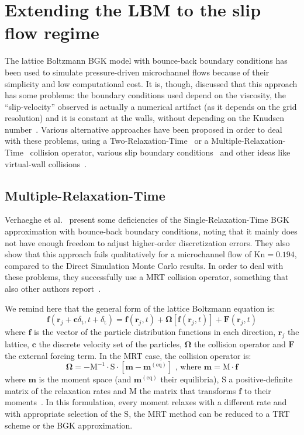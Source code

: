 \section{Extending the LBM to the slip flow regime}
The lattice Boltzmann BGK model with bounce-back boundary conditions has been
used to simulate pressure-driven microchannel flows because of their simplicity
and low computational cost. It is, though, discussed that this approach has some
problems: the boundary conditions used depend on the viscosity, the ``slip-velocity''
observed is actually a numerical artifact (as it depends on the grid resolution)
and it is constant at the walls, without
depending on the Knudsen number~\cite{Verhaeghe2009}. Various alternative
approaches have been proposed in order to deal with these problems, using a
Two-Relaxation-Time~\cite{Norouzi2015} or a Multiple-Relaxation-Time~\cite{Verhaeghe2009} collision operator, various slip
boundary conditions~\cite{Zhang2012} and other ideas like virtual-wall collisions~\cite{Toschi2005}.

\subsection{Multiple-Relaxation-Time}
Verhaeghe et al.~\cite{Verhaeghe2009} present some deficiencies of the Single-Relaxation-Time BGK approximation
with bounce-back boundary conditions, noting that it mainly does not have enough
freedom to adjust higher-order discretization errors. They
also show that this approach fails qualitatively for a 
microchannel flow of $\mathrm{Kn}=0.194$, compared to the Direct Simulation Monte Carlo results.
In order to deal with these problems, they successfully use a MRT collision operator,
something that also other authors report~\cite{Li2011, Neumann2012, Norouzi2015}.

We remind here that the general form of the lattice Boltzmann equation is:
\begin{equation}
 \mathbf{f}(\mathbf{r}_j + \mathbf{c}\delta_\mathrm{t}, t+\delta_\mathrm{t}) = \mathbf{f}(\mathbf{r}_j, t) + \mathbf{\Omega}[\mathbf{f}(\mathbf{r}_j, t)] + \mathbf{F}(\mathbf{r}_j, t)
\end{equation}
where $\mathbf{f}$ is the vector of the particle distribution functions in each direction, $\mathbf{r}_j$ the lattice,
$\mathbf{c}$ the discrete velocity set of the particles, $\mathbf{\Omega}$ the collision operator
and $\mathbf{F}$ the external forcing term. In the MRT case, the collision operator
is:
\begin{equation}
 \mathbf{\Omega} = - \mathrm{M}^{-1} \cdot \mathrm{S} \cdot [\mathbf{m} - \mathbf{m}^\mathrm{(eq)}] 
 \textrm{ , where }
 \mathbf{m} = \mathrm{M} \cdot \mathbf{f}
\end{equation}
where $\mathbf{m}$ is the moment space (and $\mathbf{m}^\mathrm{(eq)}$ their equilibria), $\mathrm{S}$ a positive-definite matrix of
the relaxation rates and $\mathrm{M}$ the matrix that transforms $\mathbf{f}$ to
their moments~\cite{Verhaeghe2009}.
In this formulation, every moment relaxes with a different rate and 
with appropriate selection of the $\mathrm{S}$, the MRT method can be reduced to a TRT scheme
or the BGK approximation.


